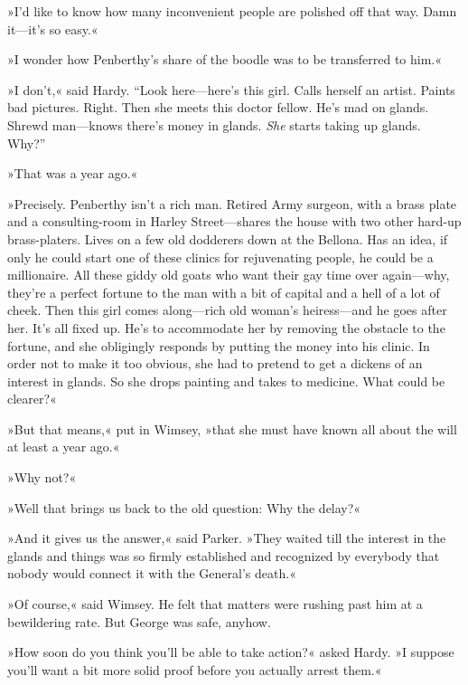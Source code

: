 »I'd like to know how many inconvenient people are polished off that way. Damn it\allowbreak---\allowbreak it's so easy.«

»I wonder how Penberthy's share of the boodle was to be transferred to him.«

»I don't,« said Hardy. \enquote{Look here\allowbreak---\allowbreak here's this girl. Calls herself an artist. Paints bad pictures. Right. Then she meets this doctor fellow. He's mad on glands. Shrewd man\allowbreak---\allowbreak knows there's money in glands. \textit{She} starts taking up glands. Why?}

»That was a year ago.«

»Precisely. Penberthy isn't a rich man. Retired Army surgeon, with a brass plate and a consulting-room in Harley Street\allowbreak---\allowbreak shares the house with two other hard-up brass-platers. Lives on a few old dodderers down at the Bellona. Has an idea, if only he could start one of these clinics for rejuvenating people, he could be a millionaire. All these giddy old goats who want their gay time over again\allowbreak---\allowbreak why, they're a perfect fortune to the man with a bit of capital and a hell of a lot of cheek. Then this girl comes along\allowbreak---\allowbreak rich old woman's heiress\allowbreak---\allowbreak and he goes after her. It's all fixed up. He's to accommodate her by removing the obstacle to the fortune, and she obligingly responds by putting the money into his clinic. In order not to make it too obvious, she had to pretend to get a dickens of an interest in glands. So she drops painting and takes to medicine. What could be clearer?«

»But that means,« put in Wimsey, »that she must have known all about the will at least a year ago.«

»Why not?«

»Well that brings us back to the old question: Why the delay?«

»And it gives us the answer,« said Parker. »They waited till the interest in the glands and things was so firmly established and recognized by everybody that nobody would connect it with the General's death.«

»Of course,« said Wimsey. He felt that matters were rushing past him at a bewildering rate. But George was safe, anyhow.

»How soon do you think you'll be able to take action?« asked Hardy. »I suppose you'll want a bit more solid proof before you actually arrest them.«

